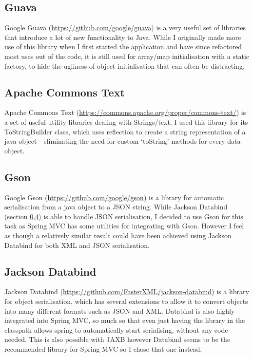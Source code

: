 \documentclass[12pt]{article}
\begin{document}
  \subsection{Guava}
    Google Guava (\url{https://github.com/google/guava}) is a very useful set of libraries that introduce a lot of new functionality to Java. While I originally made more use of this library when I first started the application and have since refactored most uses out of the code, it is still used for array/map initialisation with a static factory, to hide the ugliness of object initialisation that can often be distracting.

  \subsection{Apache Commons Text}
    Apache Commons Text (\url{https://commons.apache.org/proper/commons-text/}) is a set of useful utility libraries dealing with Strings/text. I used this library for its ToStringBuilder class, which uses reflection to create a string representation of a java object - eliminating the need for custom ‘toString’ methods for every data object.

  \subsection{Gson}
    Google Gson (\url{https://github.com/google/gson}) is a library for automatic serialisation from a java object to a JSON string. While Jackson Databind (section \ref{jackson-databind}) is able to handle JSON serialisation, I decided to use Gson for this task as Spring MVC has some utilities for integrating with Gson. However I feel as though a relatively similar result could have been achieved using Jackson Databind for both XML and JSON serialisation.

  \subsection{Jackson Databind}
    \label{jackson-databind}
    Jackson Databind (\url{https://github.com/FasterXML/jackson-databind}) is a library for object serialisation, which has several extensions to allow it to convert objects into many different formats such as JSON and XML. Databind is also highly integrated into Spring MVC, so much so that even just having the library in the classpath allows spring to automatically start serialising, without any code needed. This is also possible with JAXB however Databind seems to be the recommended library for Spring MVC so I chose that one instead.
\end{document}
